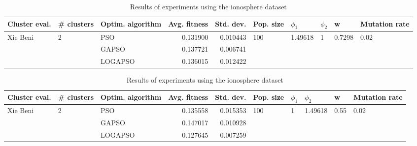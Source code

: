 \documentclass{article}
\begin{document}
\begin{table}
\centering
\caption{Results of experiments using the ionosphere dataset}
\begin{tabular}{lllrrlllll}
\toprule
            Cluster eval. &        \# clusters & Optim. algorithm &  Avg. fitness &  Std. dev. &            Pop. size &               $\phi_{1}$ &         $\phi_{2}$ &                       w &         Mutation rate \\
\midrule
\multirow{3}{*}{Xie Beni} & \multirow{3}{*}{2} &              PSO &      0.131900 &   0.010443 & \multirow{3}{*}{100} & \multirow{3}{*}{1.49618} & \multirow{3}{*}{1} & \multirow{3}{*}{0.7298} & \multirow{3}{*}{0.02} \\
                          &                    &            GAPSO &      0.137721 &   0.006741 &                      &                          &                    &                         &                       \\
                          &                    &          LOGAPSO &      0.136015 &   0.012422 &                      &                          &                    &                         &                       \\
\bottomrule
\end{tabular}
\end{table}
\begin{table}
\centering
\caption{Results of experiments using the ionosphere dataset}
\begin{tabular}{lllrrlllll}
\toprule
            Cluster eval. &        \# clusters & Optim. algorithm &  Avg. fitness &  Std. dev. &            Pop. size &         $\phi_{1}$ &               $\phi_{2}$ &                     w &         Mutation rate \\
\midrule
\multirow{3}{*}{Xie Beni} & \multirow{3}{*}{2} &              PSO &      0.135558 &   0.015353 & \multirow{3}{*}{100} & \multirow{3}{*}{1} & \multirow{3}{*}{1.49618} & \multirow{3}{*}{0.55} & \multirow{3}{*}{0.02} \\
                          &                    &            GAPSO &      0.147017 &   0.010928 &                      &                    &                          &                       &                       \\
                          &                    &          LOGAPSO &      0.127645 &   0.007259 &                      &                    &                          &                       &                       \\
\bottomrule
\end{tabular}
\end{table}
\end{document}
